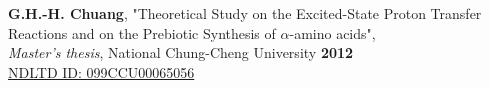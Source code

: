 \textbf{G.H.-H. Chuang}, "Theoretical Study on the Excited-State Proton Transfer Reactions and on the Prebiotic Synthesis of $\alpha$-amino acids", \\
\textit{Master's thesis}, National Chung-Cheng University \hfill \textbf{2012} \\
\null \hfill \href{https://tinyurl.com/9628dcpd}{NDLTD ID: 099CCU00065056}


\endinput